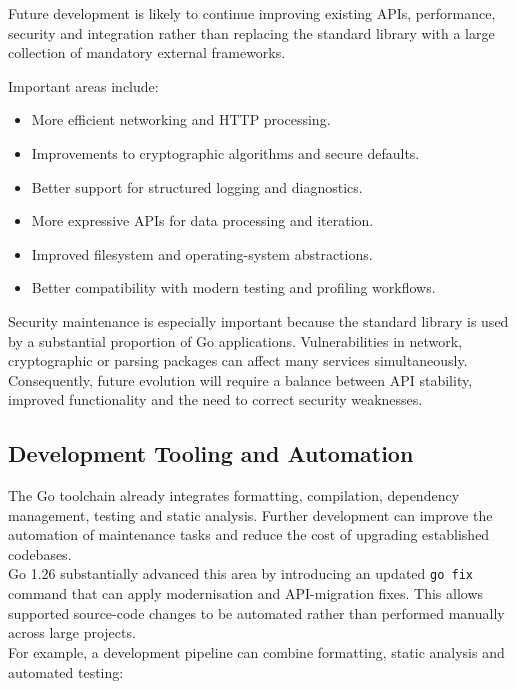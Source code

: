 Future development is likely to continue improving existing APIs, performance, security and integration rather than replacing the standard library with a large collection of mandatory external frameworks.

Important areas include:

\begin{itemize}
    \item More efficient networking and HTTP processing.
    \item Improvements to cryptographic algorithms and secure defaults.
    \item Better support for structured logging and diagnostics.
    \item More expressive APIs for data processing and iteration.
    \item Improved filesystem and operating-system abstractions.
    \item Better compatibility with modern testing and profiling workflows.
\end{itemize}

Security maintenance is especially important because the standard library is used by a substantial proportion of Go applications. Vulnerabilities in network, cryptographic or parsing packages can affect many services simultaneously.\\

Consequently, future evolution will require a balance between API stability, improved functionality and the need to correct security weaknesses.

\subsection{Development Tooling and Automation}

The Go toolchain already integrates formatting, compilation, dependency management, testing and static analysis. Further development can improve the automation of maintenance tasks and reduce the cost of upgrading established codebases.\\

Go 1.26 substantially advanced this area by introducing an updated \texttt{go fix} command that can apply modernisation and API-migration fixes. This allows supported source-code changes to be automated rather than performed manually across large projects.\\

For example, a development pipeline can combine formatting, static analysis and automated testing:

